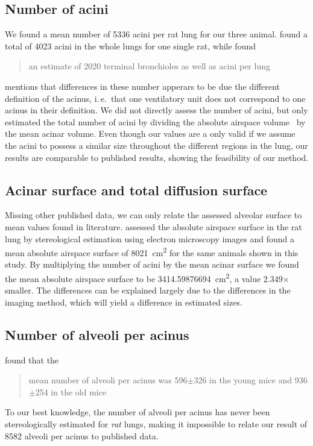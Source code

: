 \documentclass[twoside,paper=a4,abstract=true,english,DIV=calc]{scrartcl}
\newcommand{\ie}{i.\,e.\ }
\newcommand{\meantotalnumberofacini}{5336}
\newcommand{\meannumberofalveoli}{8582} %
\newcommand{\meanairspacesurface}{3414.59876694} %
\newcommand{\airspacedifference}{2.349} %
\begin{document}
\subsection{Number of acini}
We found a mean number of \meantotalnumberofacini\xspace acini per rat lung for our three animal.
\citet[page 146]{Rodriguez1987} found a total of 4023 acini in the whole lungs for one single rat, while \citet{Mercer1987a} found \blockquote{an estimate of 2020 terminal bronchioles as well as acini per lung}.
\citet{Mercer1987a} mentions that differences in these number apperars to be due the different definition of the acinus, \ie that one ventilatory unit does not correspond to one acinus in their definition.
We did not directly assess the number of acini, but only estimated the total number of acini by dividing the absolute airspace volume~\cite{Tschanz2003} by the mean acinar volume.
Even though our values are a only valid if we assume the acini to possess a similar size throughout the different regions in the lung, our results are comparable to published results, showing the feasibility of our method.

\subsection{Acinar surface and total diffusion surface}
Missing other published data, we can only relate the assessed alveolar surface to mean values found in literature.
\citet{Tschanz2003} assessed the absolute airspace surface in the rat lung by stereological estimation using electron microscopy images and found a mean absolute airspace surface of \SI{8021}{\centi\metre\squared} for the same animals shown in this study.
By multiplying the number of acini by the mean acinar surface we found the mean absolute airspace surface to be \SI{\meanairspacesurface}{\centi\metre\squared}, a value \airspacedifference\(\times\) smaller.
The differences can be explained largely due to the differences in the imaging method, which will yield a difference in estimated sizes.

\subsection{Number of alveoli per acinus}
\citet{Vasilescu2012} found that the \blockquote{mean number of alveoli per acinus was 596\(\pm\)326 in the young mice and 936\(\pm\)254 in the old mice}. To our best knowledge, the number of alveoli per acinus has never been stereologically estimated for \emph{rat} lungs, making it impossible to relate our result of \meannumberofalveoli\xspace alveoli per acinus to published data.
\end{document}
